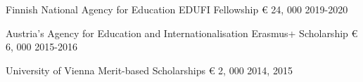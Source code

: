 \begin{cvhonors}

  \cvhonor
    {Finnish National Agency for Education} %
    {EDUFI Fellowship} %
    {€ 24, 000} %
    {2019-2020} %
    
  \cvhonor
    {Austria's Agency for Education and Internationalisation} %
    {Erasmus+ Scholarship} %
    {€ 6, 000} %
    {2015-2016} %

  \cvhonor
    {University of Vienna} %
    {Merit-based Scholarships} %
    {€ 2, 000} %
    {2014, 2015} %
\end{cvhonors}
